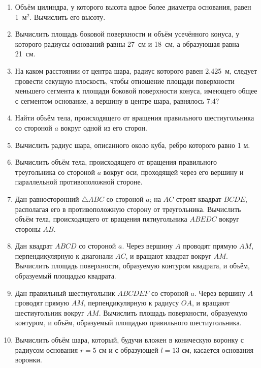 \begin{enumerate}

\item 
Объём цилиндра, у которого высота вдвое более диаметра основания, равен 1~м$^2$.
Вычислить его высоту.

\item
Вычислить площадь боковой поверхности и объём усечённого конуса, у которого радиусы оснований равны 27~см и 18~см, а образующая равна 21~см.

\item
На каком расстоянии от центра шара, радиус которого равен 2,425~м, следует провести секущую плоскость, чтобы отношение площади поверхности меньшего сегмента к площади боковой поверхности конуса, имеющего общее с сегментом основание, а вершину в центре шара, равнялось 7:4?

\item
Найти объём тела, происходящего от вращения правильного шестиугольника со стороной $a$ вокруг одной из его сторон.

\item
Вычислить радиус шара, описанного около куба, ребро которого равно 1 м.

\item
Вычислить объём тела, происходящего от вращения правильного треугольника со стороной $a$ вокруг оси, проходящей через его вершину и параллельной противоположной стороне.

\item
Дан равносторонний $\triangle ABC$ со стороной $a$;
на $AC$ строят квадрат $BCDE$, располагая его в противоположную сторону от треугольника.
Вычислить объём тела, происходящего от вращения пятиугольника $ABEDC$ вокруг стороны $AB$.

\item
Дан квадрат $ABCD$ со стороной $a$.
Через вершину $A$ проводят прямую $AM$, перпендикулярную к диагонали $AC$, и вращают квадрат вокруг $AM$.
Вычислить площадь поверхности, образуемую контуром квадрата, и объём, образуемый площадью квадрата.

\item
Дан правильный шестиугольник $ABCDEF$ со стороной $a$.
Через вершину $A$ проводят прямую $AM$, перпендикулярную к радиусу $OA$, и вращают шестиугольник вокруг $AM$.
Вычислить площадь поверхности, образуемую контуром, и объём, образуемый площадью правильного шестиугольника.


\item
Вычислить объём шара, который, будучи вложен в коническую воронку с радиусом основания $r = 5$ см и с образующей $l = 13$ см, касается основания воронки.


\end{enumerate}

